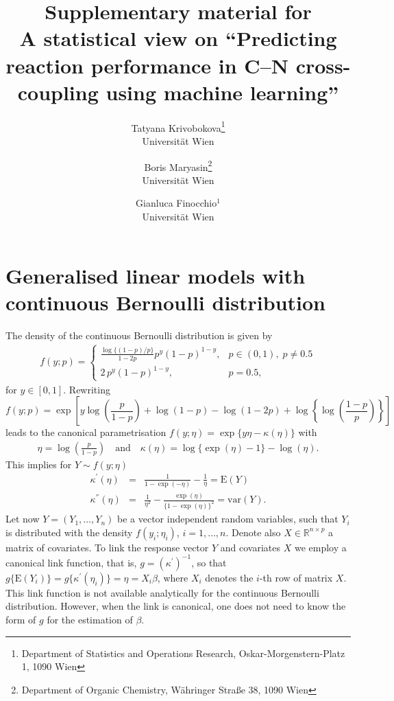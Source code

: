 \documentclass[12pt]{article}
\title{Supplementary material for\\
A statistical view on ``Predicting reaction performance in C--N cross-coupling using machine learning''}
\author{Tatyana Krivobokova\footnote{Department of Statistics and Operations Research,
Oskar-Morgenstern-Platz 1, 1090 Wien}\\{Universit\"at Wien}
\and Boris Maryasin\footnote{Department of Organic Chemistry, W\"ahringer Stra{\ss}e 38, 1090 Wien}\\{Universit\"at Wien}
\and Gianluca Finocchio$^1$\\{Universit\"at Wien}
}
\def\E{\mbox{E}}
\def\beqn{\begin{eqnarray*}}
\def\eeqn{\end{eqnarray*}}
\def\var{\mbox{var}}
\begin{document}

\baselineskip=25pt

\maketitle




\baselineskip=20pt
\doublespacing
\linespread{1.2}


\section{Generalised linear models with continuous Bernoulli distribution }\label{suppl:sec:glm-cb}
The density of the continuous Bernoulli distribution is given by
\beqn
f(y;p)=\begin{cases}
	\frac{\log\{(1-p)/p\}}{1-2p}p^y(1-p)^{1-y},&p\in(0,1), \;p\neq 0.5\\
	2\,p^y(1-p)^{1-y},&p=0.5,
\end{cases}
\eeqn 
for $y\in[0,1]$. Rewriting
$$
f(y;p)=\exp\left[y\log\left(\frac{p}{1-p}\right)+\log(1-p)-\log(1-2p)+\log\left\{\log\left(\frac{1-p}{p}\right)\right\}\right]$$
leads to the canonical parametrisation $f(y;\eta)=\exp\{y\eta-\kappa(\eta)\}$ with
\beqn
\eta=\log\left(\frac{p}{1-p}\right)\quad\mbox{and}\quad \kappa(\eta)=\log\{\exp(\eta)-1\}-\log(\eta).
\eeqn 
This implies for $Y\sim f(y;\eta)$
\beqn
\kappa^{'}(\eta)&=&\frac{1}{1-\exp(-\eta)}-\frac{1}{\eta}=\E(Y)\\
\kappa^{''}(\eta)&=&\frac{1}{\eta^2}-\frac{\exp(\eta)}{\{1-\exp(\eta)\}^2}=\var(Y).
\eeqn 
Let now $Y=(Y_1,\ldots,Y_n)$ be a vector independent random variables, such that $Y_i$ is distributed with the density $f(y_i;\eta_i)$, $i=1,\ldots,n$. Denote also $X\in\mathbb{R}^{n\times p}$ a matrix of covariates. To link the response vector $Y$ and covariates $X$ we employ a canonical link function, that is, $g=(\kappa^{'})^{-1}$, so that $g\{\E(Y_i)\}=g\{\kappa^{'}(\eta_i)\}=\eta=X_i\beta$, where $X_i$ denotes the $i$-th row of matrix $X$. This link function is not available analytically for the continuous Bernoulli distribution. However, when the link is canonical, one does not need to know the form of $g$ for the estimation of $\beta$. %
\end{document}
